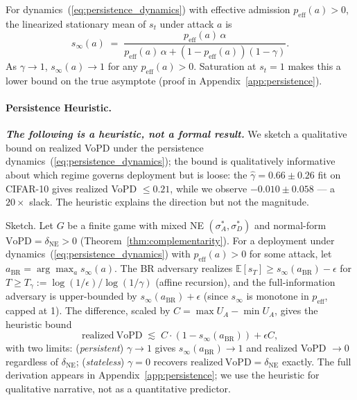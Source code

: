 \documentclass{article}
\begin{document}
\begin{proposition}
\label{thm:persistence}
For dynamics~(\ref{eq:persistence_dynamics}) with effective admission $p_{\mathrm{eff}}(a) > 0$, the linearized stationary mean of $s_t$ under attack $a$ is
\[
s_\infty(a) \;=\; \frac{p_{\mathrm{eff}}(a)\,\alpha}{p_{\mathrm{eff}}(a)\,\alpha + (1-p_{\mathrm{eff}}(a))(1-\gamma)}.
\]
As $\gamma \to 1$, $s_\infty(a) \to 1$ for any $p_{\mathrm{eff}}(a) > 0$. Saturation at $s_t = 1$ makes this a lower bound on the true asymptote (proof in Appendix~\ref{app:persistence}).
\end{proposition}

\paragraph{Persistence Heuristic.}\label{thm:persistence_collapse}
\textbf{\emph{The following is a heuristic, not a formal result.}} We sketch a qualitative bound on realized VoPD under the persistence dynamics~(\ref{eq:persistence_dynamics}); the bound is qualitatively informative about which regime governs deployment but is loose: the $\hat\gamma=0.66 \pm 0.26$ fit on CIFAR-10 gives realized VoPD $\leq 0.21$, while we observe $-0.010 \pm 0.058$ --- a $20\times$ slack. The heuristic explains the direction but not the magnitude.

Sketch. Let $G$ be a finite game with mixed NE $(\sigma_A^*, \sigma_D^*)$ and normal-form $\mathrm{VoPD} = \delta_{\mathrm{NE}} > 0$ (Theorem~\ref{thm:complementarity}). For a deployment under dynamics~(\ref{eq:persistence_dynamics}) with $p_{\mathrm{eff}}(a) > 0$ for some attack, let $a_{\mathrm{BR}} = \arg\max_a s_\infty(a)$. The BR adversary realizes $\mathbb{E}[s_T] \geq s_\infty(a_{\mathrm{BR}}) - \epsilon$ for $T \geq T_\gamma := \log(1/\epsilon)/\log(1/\gamma)$ (affine recursion), and the full-information adversary is upper-bounded by $s_\infty(a_{\mathrm{BR}}) + \epsilon$ (since $s_\infty$ is monotone in $p_{\mathrm{eff}}$, capped at 1). The difference, scaled by $C = \max U_A - \min U_A$, gives the heuristic bound
\begin{equation}
\mathrm{realized\ VoPD} \;\lesssim\; C \cdot (1 - s_\infty(a_{\mathrm{BR}})) + \epsilon C,
\label{eq:realized_vopd_bound}
\end{equation}
with two limits: (\emph{persistent}) $\gamma \to 1$ gives $s_\infty(a_{\mathrm{BR}}) \to 1$ and realized VoPD $\to 0$ regardless of $\delta_{\mathrm{NE}}$; (\emph{stateless}) $\gamma = 0$ recovers $\mathrm{realized\ VoPD} = \delta_{\mathrm{NE}}$ exactly. The full derivation appears in Appendix~\ref{app:persistence}; we use the heuristic for qualitative narrative, not as a quantitative predictor.
\end{document}

